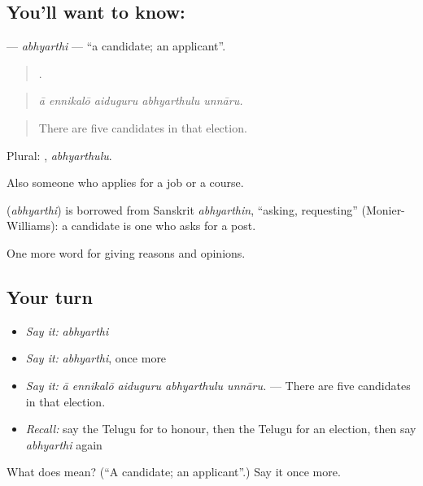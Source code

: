 \subsection*{You'll want to know: }
\textbf{} — \emph{abhyarthi} — \textquotedblleft{}a candidate; an applicant\textquotedblright{}.

\begin{quote}
    .
\end{quote}

\begin{quote}
\emph{ā ennikalō aiduguru abhyarthulu unnāru.}
\end{quote}

\begin{quote}
There are five candidates in that election.
\end{quote}

Plural: , \emph{abhyarthulu}.

Also someone who applies for a job or a course.

\begin{cousinweb}
\textbf{} (\emph{abhyarthi}) is borrowed from Sanskrit \emph{abhyarthin}, \textquotedblleft{}asking, requesting\textquotedblright{} (Monier-Williams): a candidate is one who asks for a post.
\end{cousinweb}

\begin{grammarlens}[title={What you've built}]
One more word for giving reasons and opinions.
\end{grammarlens}

\subsection*{Your turn}
\begin{itemize}
\raggedright
  \item \emph{Say it:} \emph{abhyarthi}
  \item \emph{Say it:} \emph{abhyarthi}, once more
  \item \emph{Say it:} \emph{ā ennikalō aiduguru abhyarthulu unnāru.} — There are five candidates in that election.
  \item \emph{Recall:} say the Telugu for to honour, then the Telugu for an election, then say \emph{abhyarthi} again
\end{itemize}

\begin{tcolorbox}[breakable,colback=teal!4,colframe=teal!35!black,title={Before you move on}]
What does  mean? (\textquotedblleft{}A candidate; an applicant\textquotedblright{}.) Say it once more.
\end{tcolorbox}
